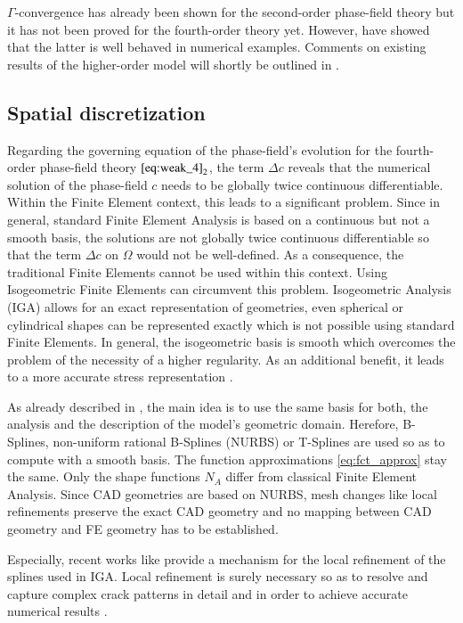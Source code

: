 $\Gamma$-convergence has already been shown for the second-order phase-field theory but it has not been proved for the fourth-order theory yet. However, \citet{02_PF_HO_brittle} have showed that the latter is well behaved in numerical examples. Comments on existing results of the higher-order model will shortly be outlined in .



\subsection{Spatial discretization} \label{sec:space_discr}
Regarding the governing equation of the phase-field's evolution for the fourth-order phase-field theory $\eqref{eq:weak_4}_{2}$, the term $\Delta c$ reveals that the numerical solution of the phase-field $c$ needs to be globally twice continuous differentiable. Within the Finite Element context, this leads to a significant problem. Since in general, standard Finite Element Analysis is based on a continuous but not a smooth basis, the solutions are not globally twice continuous differentiable so that the term $\Delta c$ on $\Omega$ would not be well-defined. As a consequence, the traditional Finite Elements cannot be used within this context. Using Isogeometric Finite Elements can circumvent this problem. Isogeometric Analysis (IGA) allows for an exact representation of geometries, even spherical or cylindrical shapes can be represented exactly which is not possible using standard Finite Elements. In general, the isogeometric basis is smooth which overcomes the problem of the necessity of a higher regularity. As an additional benefit, it leads to a more accurate stress representation \cite{01_PF_dyn_brittle}.

As already described in , the main idea is to use the same basis for both, the analysis and the description of the model's geometric domain. Herefore, B-Splines, non-uniform rational B-Splines (NURBS) or T-Splines are used so as to compute with a smooth basis. The function approximations \eqref{eq:fct_approx} stay the same. Only the shape functions $N_{A}$ differ from classical Finite Element Analysis. Since CAD geometries are based on NURBS, mesh changes like local refinements preserve the exact CAD geometry and no mapping between CAD geometry and FE geometry has to be established. \citep{11_PF_DissBorden}

Especially, recent works like \cite{17_IGA_LRNURBS} provide a mechanism for the local refinement of the splines used in IGA. Local refinement is surely necessary so as to resolve and capture complex crack patterns in detail and in order to achieve accurate numerical results \cite{01_PF_dyn_brittle}.


